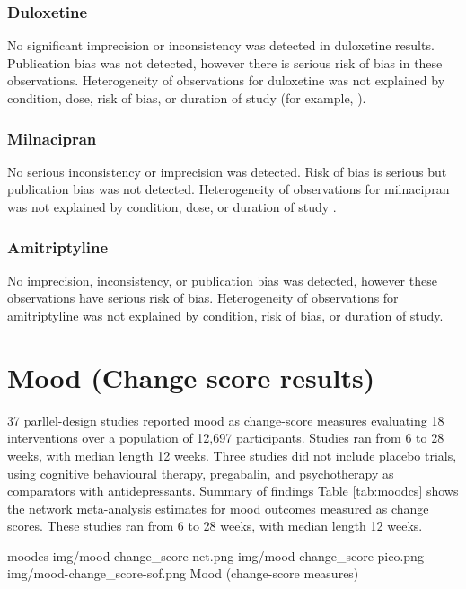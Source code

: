 \documentclass{report}\usepackage[]{graphicx}\usepackage[]{color}
\begin{document}
\subsubsection{Duloxetine}

No significant imprecision or inconsistency was detected in duloxetine results. Publication bias was not detected, however there is serious risk of bias in these observations. Heterogeneity of observations for duloxetine was not explained by condition, dose, risk of bias, or duration of study (for example, ).

\subsubsection{Milnacipran}

No serious inconsistency or imprecision was detected. Risk of bias is serious but publication bias was not detected. Heterogeneity of observations for milnacipran was not explained by condition, dose, or duration of study .

\subsubsection{Amitriptyline}

No imprecision, inconsistency, or publication bias was detected, however these observations have serious risk of bias. Heterogeneity of observations for amitriptyline was not explained by condition, risk of bias, or duration of study.



\section{Mood (Change score results)}

37 parllel-design studies reported mood as change-score measures evaluating 18 interventions over a population of 12,697 participants. Studies ran from 6 to 28 weeks, with median length 12 weeks. Three studies did not include placebo trials, using cognitive behavioural therapy, pregabalin, and psychotherapy as comparators with antidepressants. Summary of findings Table \ref{tab:moodcs} shows the network meta-analysis estimates for mood outcomes measured as change scores. These studies ran from 6 to 28 weeks, with median length 12 weeks.

\soffignew
{moodcs}
{img/mood-change_score-net.png}
{img/mood-change_score-pico.png}
{img/mood-change_score-sof.png}
{Mood (change-score measures)}
\end{document}
